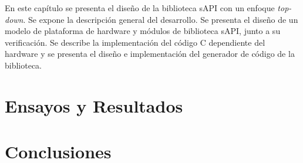 \documentclass[
11pt, %
spanish,
singlespacing, %
parskip, %
headsepline, %
]{MastersDoctoralThesis} %
\begin{document}
En este capítulo se presenta el diseño de la biblioteca sAPI con un enfoque \emph{top-down}. Se expone la descripción general del desarrollo. Se presenta el diseño de un modelo de plataforma de hardware y módulos de biblioteca sAPI, junto a su verificación. Se describe la implementación del código C dependiente del hardware y se presenta el diseño e implementación del generador de código de la biblioteca.





 





 

%


%
%
%
%
%

\chapter{Ensayos y Resultados}
\label{ChapterEnsayosYResultados}



\chapter{Conclusiones} %
\label{ChapterConclusiones} 

 

\end{document}
